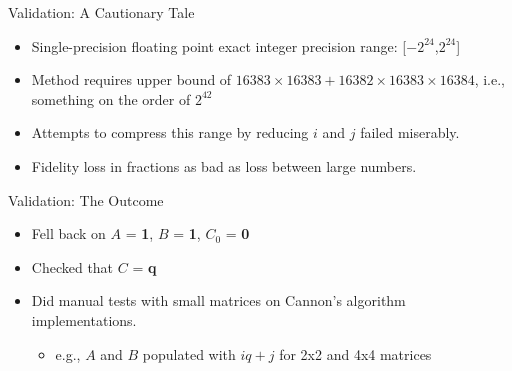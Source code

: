 \documentclass{beamer}
\begin{document}
\begin{frame}{Validation: A Cautionary Tale}
  \begin{itemize}
  \item{Single-precision floating point exact integer precision range: [$-2^{24}$,$2^{24}$]\autocite{SPIntLimit}}
  \item{Method requires upper bound of $16383 \times 16383 + 16382 \times 16383 \times 16384$, i.e., something on the order of $2^{42}$}
  \item{Attempts to compress this range by reducing $i$ and $j$ failed miserably.}
  \item{Fidelity loss in fractions as bad as loss between large numbers.}
  \end{itemize}
\end{frame}
\begin{frame}{Validation: The Outcome}
  \begin{itemize}
  \item{Fell back on $A$ = \textbf{1}, $B$ = \textbf{1}, $C_{0}$ = \textbf{0}}
  \item{Checked that $C$ = \textbf{q}}
  \item{Did manual tests with small matrices on Cannon's algorithm implementations.}
    \begin{itemize}
    \item{e.g., $A$ and $B$ populated with $iq + j$ for 2x2 and 4x4 matrices}
    \end{itemize}
  \end{itemize}
\end{frame}
\end{document}

